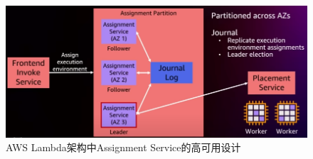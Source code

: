 \begin{figure}[ht!]
    \centering
    \includegraphics[width=\linewidth]{images/lambda_assignment_service.png}
    \caption{AWS Lambda架构中Assignment Service的高可用设计\cite{aws_lambda_2022}}
    \label{lambda_assignment_service}
\end{figure}